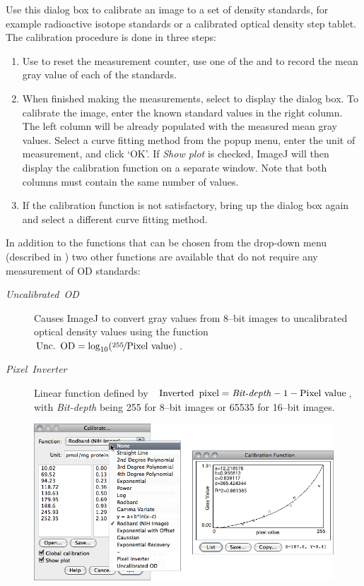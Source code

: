 Use
this dialog box to calibrate an image to a set of density standards,
for example radioactive isotope standards or a calibrated optical
density step tablet. The calibration procedure is done in three steps: 
\begin{enumerate}
\item Use 
to reset the measurement counter, use one of the 
and 
to record the mean gray value of each of the standards. 
\item When finished making the measurements, select 
to display the  dialog box. To calibrate
the image, enter the known standard values in the right column. The
left column will be already populated with the measured mean gray
values. Select a curve fitting method from the popup menu, enter the
unit of measurement, and click `OK'. If \emph{Show plot} is checked,
ImageJ will then display the calibration function on a separate window.
Note that both columns must contain the same number of values.
\item If the calibration function is not satisfactory, bring up the 
dialog box again and select a different curve fitting method.
\end{enumerate}
In addition to the functions that can be chosen from the drop-down
menu (described in )
two other functions are available that do not require any measurement
of OD standards:
\begin{description}
\item [{\emph{Uncalibrated\ OD}}] Causes ImageJ to convert gray values
from 8--bit images to uncalibrated optical density values using the
function~ $\mbox{Unc.\,\ OD}=\log_{10}(\nicefrac{255}{\mbox{Pixel value}})$.
\item [{\emph{Pixel\ Inverter}}] Linear function defined by~ $\mbox{Inverted\,\ pixel}=\mbox{\emph{Bit-depth}}-1-\mbox{Pixel value}$,
with \emph{Bit-depth} being 255 for 8--bit images or 65535 for 16--bit
images.
\end{description}
\begin{figure}[h]
\noindent \centering{}\includegraphics[scale=0.55]{images/Calibrate}
\end{figure}



